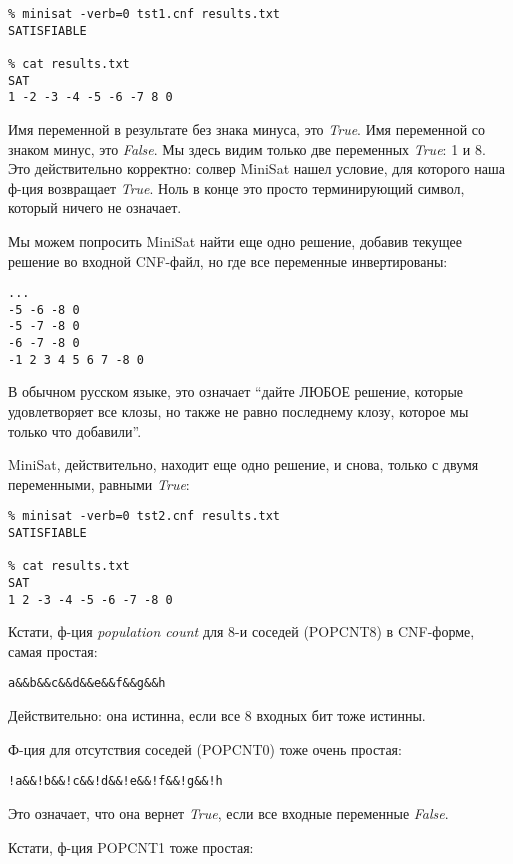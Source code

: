 \begin{lstlisting}
% minisat -verb=0 tst1.cnf results.txt
SATISFIABLE

% cat results.txt
SAT
1 -2 -3 -4 -5 -6 -7 8 0
\end{lstlisting}

Имя переменной в результате без знака минуса, это \textit{True}.
Имя переменной со знаком минус, это \textit{False}.
Мы здесь видим только две переменных \textit{True}: 1 и 8.
Это действительно корректно: солвер MiniSat нашел условие, для которого наша ф-ция возвращает \textit{True}.
Ноль в конце это просто терминирующий символ, который ничего не означает.

Мы можем попросить MiniSat найти еще одно решение, добавив текущее решение во входной CNF-файл,
но где все переменные инвертированы:

\begin{lstlisting}
...
-5 -6 -8 0
-5 -7 -8 0
-6 -7 -8 0
-1 2 3 4 5 6 7 -8 0
\end{lstlisting}

В обычном русском языке, это означает ``дайте ЛЮБОЕ решение, которые удовлетворяет все клозы, но также не равно
последнему клозу, которое мы только что добавили''.

MiniSat, действительно, находит еще одно решение, и снова, только с двумя переменными, равными \textit{True}:

\begin{lstlisting}
% minisat -verb=0 tst2.cnf results.txt
SATISFIABLE

% cat results.txt
SAT
1 2 -3 -4 -5 -6 -7 -8 0
\end{lstlisting}

Кстати, ф-ция \textit{population count} для 8-и соседей (POPCNT8) в CNF-форме, самая простая:

\begin{lstlisting}
a&&b&&c&&d&&e&&f&&g&&h
\end{lstlisting}

Действительно: она истинна, если все 8 входных бит тоже истинны.

Ф-ция для отсутствия соседей (POPCNT0) тоже очень простая:

\begin{lstlisting}
!a&&!b&&!c&&!d&&!e&&!f&&!g&&!h
\end{lstlisting}

Это означает, что она вернет \textit{True}, если все входные переменные \textit{False}.

Кстати, ф-ция POPCNT1 тоже простая:


